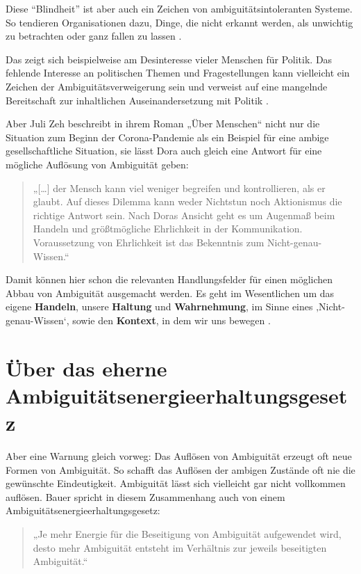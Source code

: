 \documentclass[
  ngerman,
  letterpaper,
  DIV=11]{scrartcl}
\begin{document}
Diese ``Blindheit'' ist aber auch ein Zeichen von
ambiguitätsintoleranten Systeme. So tendieren Organisationen dazu,
Dinge, die nicht erkannt werden, als unwichtig zu betrachten oder ganz
fallen zu lassen \autocite[54]{bauer2018}.

Das zeigt sich beispielweise am Desinteresse vieler Menschen für
Politik. Das fehlende Interesse an politischen Themen und
Fragestellungen kann vielleicht ein Zeichen der Ambiguitätsverweigerung
sein und verweist auf eine mangelnde Bereitschaft zur inhaltlichen
Auseinandersetzung mit Politik \autocite[13 und 25]{bauer2018}.

Aber Juli Zeh beschreibt in ihrem Roman „Über Menschen`` nicht nur die
Situation zum Beginn der Corona-Pandemie als ein Beispiel für eine
ambige gesellschaftliche Situation, sie lässt Dora auch gleich eine
Antwort für eine mögliche Auflösung von Ambiguität geben:

\begin{quote}
„{[}\ldots{]} der Mensch kann viel weniger begreifen und kontrollieren,
als er glaubt. Auf dieses Dilemma kann weder Nichtstun noch Aktionismus
die richtige Antwort sein. Nach Doras Ansicht geht es um Augenmaß beim
Handeln und größtmögliche Ehrlichkeit in der Kommunikation.
Voraussetzung von Ehrlichkeit ist das Bekenntnis zum
Nicht-genau-Wissen.``
\end{quote}

Damit können hier schon die relevanten Handlungsfelder für einen
möglichen Abbau von Ambiguität ausgemacht werden. Es geht im
Wesentlichen um das eigene \textbf{Handeln}, unsere \textbf{Haltung} und
\textbf{Wahrnehmung}, im Sinne eines ‚Nicht-genau-Wissen`, sowie den
\textbf{Kontext}, in dem wir uns bewegen \autocite[vgl.][]{kozica2025}.

\section{Über das eherne
Ambiguitätsenergieerhaltungsgesetz}\label{uxfcber-das-eherne-ambiguituxe4tsenergieerhaltungsgesetz}

Aber eine Warnung gleich vorweg: Das Auflösen von Ambiguität erzeugt oft
neue Formen von Ambiguität. So schafft das Auflösen der ambigen Zustände
oft nie die gewünschte Eindeutigkeit. Ambiguität lässt sich vielleicht
gar nicht vollkommen auflösen. Bauer spricht in diesem Zusammenhang auch
von einem Ambiguitätsenergieerhaltungsgesetz:

\begin{quote}
„Je mehr Energie für die Beseitigung von Ambiguität aufgewendet wird,
desto mehr Ambiguität entsteht im Verhältnis zur jeweils beseitigten
Ambiguität.`` \autocite[76]{bauer2018}
\end{quote}
\end{document}
